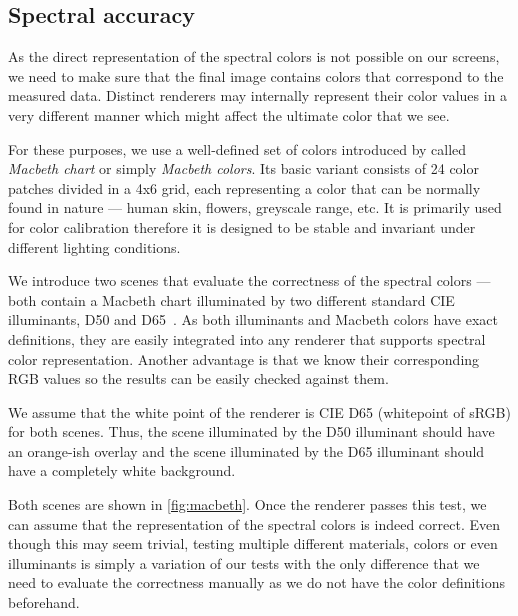 \subsection{Spectral accuracy}

As the direct representation of the spectral colors is not possible on our screens, we need to make sure that the final image contains colors that correspond to the measured data. Distinct renderers may internally represent their color values in a very different manner which might affect the ultimate color that we see.

For these purposes, we use a well-defined set of colors introduced by \citet{mccamy1976color} called \emph{Macbeth chart} or simply \emph{Macbeth colors}. Its basic variant consists of 24 color patches divided in a 4x6 grid, each representing a color that can be normally found in nature --- human skin, flowers, greyscale range, etc. It is primarily used for color calibration therefore it is designed to be stable and invariant under different lighting conditions.

We introduce two scenes that evaluate the correctness of the spectral colors --- both contain a Macbeth chart illuminated by two different standard CIE illuminants, D50 and D65~\cite{cieIlluminants}. As both illuminants and Macbeth colors have exact definitions, they are easily integrated into any renderer that supports spectral color representation. Another advantage is that we know their corresponding RGB values so the results can be easily checked against them.

We assume that the white point of the renderer is CIE D65 (whitepoint of sRGB) for both scenes. Thus, the scene illuminated by the D50 illuminant should have an orange-ish overlay and the scene illuminated by the D65 illuminant should have a completely white background.

Both scenes are shown in \autoref{fig:macbeth}. Once the renderer passes this test, we can assume that the representation of the spectral colors is indeed correct. Even though this may seem trivial, testing multiple different materials, colors or even illuminants is simply a variation of our tests with the only difference that we need to evaluate the correctness manually as we do not have the color definitions beforehand.

